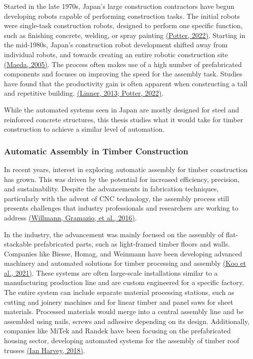 \documentclass[11pt]{book}
\begin{document}
Started in the late 1970s, Japan’s large construction contractors have begun developing robots capable of performing construction tasks. The initial robots were single-task construction robots, designed to perform one specific function, such as finishing concrete, welding, or spray painting \href{https://www.zotero.org/google-docs/?vwNv2H}{(Potter, 2022)}. Starting in the mid-1980s, Japan’s construction robot development shifted away from individual robots, and towards creating an entire robotic construction site \href{https://www.zotero.org/google-docs/?f7fifK}{(Maeda, 2005)}. The process often makes use of a high number of prefabricated components and focuses on improving the speed for the assembly task. Studies have found that the productivity gain is often apparent when constructing a tall and repetitive building. \href{https://www.zotero.org/google-docs/?NRpif9}{(Linner, 2013; Potter, 2022)}. 

While the automated systems seen in Japan are mostly designed for steel and reinforced concrete structures, this thesis studies what it would take for timber construction to achieve a similar level of automation. 

\subsubsection{Automatic Assembly in Timber Construction}

In recent years, interest in exploring automatic assembly for timber construction has grown. This was driven by the potential for increased efficiency, precision, and sustainability. Despite the advancements in fabrication techniques, particularly with the advent of CNC technology, the assembly process still presents challenges that industry professionals and researchers are working to address \href{https://www.zotero.org/google-docs/?VCZ0h4}{(Willmann, Gramazio, et al., 2016)}.

In the industry, the advancement was mainly focused on the assembly of flat-stackable prefabricated parts, such as light-framed timber floors and walls. Companies like Biesse, Homag, and Weinmann have been developing advanced machinery and automated solutions for timber processing and assembly \href{https://www.zotero.org/google-docs/?Ii4M5y}{(Koo et al., 2021)}. These systems are often large-scale installations similar to a manufacturing production line and are custom engineered for a specific factory. The entire system can include separate material processing stations, such as cutting and joinery machines and for linear timber and panel saws for sheet materials. Processed materials would merge into a central assembly line and be assembled using nails, screws and adhesive depending on its design. Additionally, companies like MiTek and Randek have been focusing on the prefabricated housing sector, developing automated systems for the assembly of timber roof trusses \href{https://www.zotero.org/google-docs/?N2kZjO}{(Ian Harvey, 2018)}. 
\end{document}
